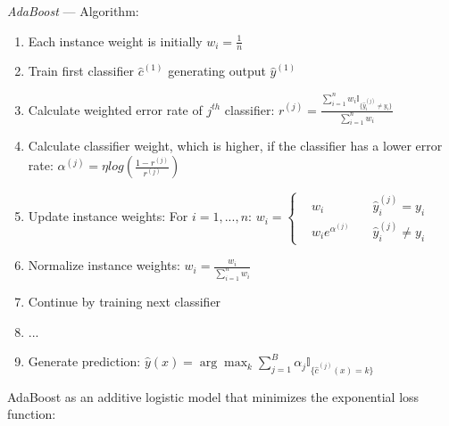 \emph{AdaBoost} --- 
Algorithm:
\begin{enumerate}
    \item Each instance weight is initially $w_i = \frac{1}{n}$
    \item Train first classifier $\hat{c}^{(1)}$ generating output $\hat{y}^{(1)}$
    \item Calculate weighted error rate of $j^{th}$ classifier: $r^{(j)} = \frac{ \sum_{i=1}^n w_i \mathbb{I}_{\{ \hat{y}_i^{(j)} \neq y_i \}} }{ \sum_{i=1}^n w_i }$
    \item Calculate classifier weight, which is higher, if the classifier has a lower error rate: $\alpha^{(j)} = \eta log( \frac{1-r^{(j)}}{r^{(j)}} )$
    \item Update instance weights: For $i = 1, ..., n$: 
    $w_i = 
    \left\{
        \begin{aligned}
             & w_i \quad & \hat{y}_i^{(j)} = y_i \\
             & w_i e^{\alpha^{(j)}} \quad & \hat{y}_i^{(j)} \neq y_i
        \end{aligned}
    \right.$
    \item Normalize instance weights: $w_i = \frac{w_i}{\sum_{i=1}^n w_i}$
    \item Continue by training next classifier
    \item ...
    \item Generate prediction: $\hat{y}(x) = \arg\max_k \sum_{j=1}^B \alpha_j \mathbb{I}_{\{ \hat{c}^{(j)}(x) = k \}}$
\end{enumerate}
AdaBoost as an additive logistic model that minimizes the exponential loss function:
